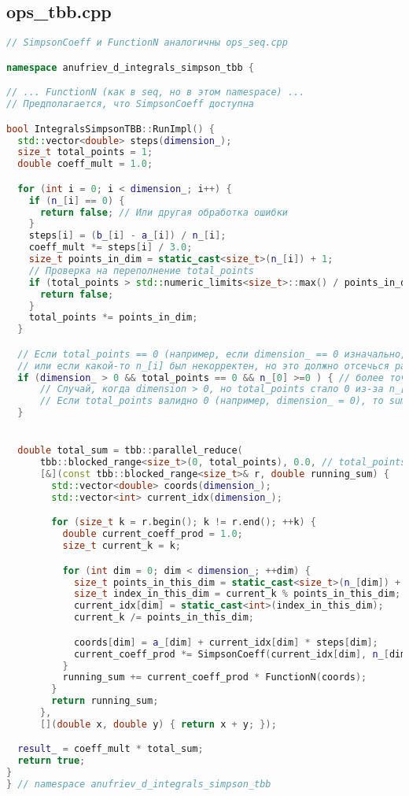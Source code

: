 \documentclass[a4paper,12pt]{article}
\begin{document}
\newpage
\subsection{ops\_tbb.cpp}
\begin{lstlisting}[language=C++, caption=Функция RunImpl из ops\_tbb.cpp, basicstyle=\ttfamily\tiny]
// SimpsonCoeff и FunctionN аналогичны ops_seq.cpp

namespace anufriev_d_integrals_simpson_tbb {

// ... FunctionN (как в seq, но в этом namespace) ...
// Предполагается, что SimpsonCoeff доступна

bool IntegralsSimpsonTBB::RunImpl() {
  std::vector<double> steps(dimension_);
  size_t total_points = 1;
  double coeff_mult = 1.0;

  for (int i = 0; i < dimension_; i++) {
    if (n_[i] == 0) {
      return false; // Или другая обработка ошибки
    }
    steps[i] = (b_[i] - a_[i]) / n_[i];
    coeff_mult *= steps[i] / 3.0;
    size_t points_in_dim = static_cast<size_t>(n_[i]) + 1;
    // Проверка на переполнение total_points
    if (total_points > std::numeric_limits<size_t>::max() / points_in_dim) {
      return false; 
    }
    total_points *= points_in_dim;
  }

  // Если total_points == 0 (например, если dimension_ == 0 изначально, хотя это должно быть обработано)
  // или если какой-то n_[i] был некорректен, но это должно отсечься раньше
  if (dimension_ > 0 && total_points == 0 && n_[0] >=0 ) { // более точная проверка, если n_ пуст или dimension = 0
      // Случай, когда dimension > 0, но total_points стало 0 из-за n_[i] = -1 (что не должно проходить preproc)
      // Если total_points валидно 0 (например, dimension_ = 0), то sum будет 0.
  }


  double total_sum = tbb::parallel_reduce(
      tbb::blocked_range<size_t>(0, total_points), 0.0, // total_points может быть 0
      [&](const tbb::blocked_range<size_t>& r, double running_sum) {
        std::vector<double> coords(dimension_);
        std::vector<int> current_idx(dimension_);

        for (size_t k = r.begin(); k != r.end(); ++k) {
          double current_coeff_prod = 1.0;
          size_t current_k = k;

          for (int dim = 0; dim < dimension_; ++dim) {
            size_t points_in_this_dim = static_cast<size_t>(n_[dim]) + 1;
            size_t index_in_this_dim = current_k % points_in_this_dim;
            current_idx[dim] = static_cast<int>(index_in_this_dim);
            current_k /= points_in_this_dim;

            coords[dim] = a_[dim] + current_idx[dim] * steps[dim];
            current_coeff_prod *= SimpsonCoeff(current_idx[dim], n_[dim]); // Нужна видимость SimpsonCoeff
          }
          running_sum += current_coeff_prod * FunctionN(coords);
        }
        return running_sum;
      },
      [](double x, double y) { return x + y; });

  result_ = coeff_mult * total_sum;
  return true;
}
} // namespace anufriev_d_integrals_simpson_tbb
\end{lstlisting}
\end{document}
